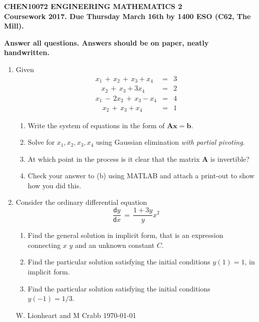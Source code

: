 \documentclass[12pt]{article}
\def\bA{\mathbf{A}}
\newcommand{\dif}{\mathsf{d}}
\begin{document}
\begin{center}{\bf\large
CHEN10072 ENGINEERING MATHEMATICS 2
\\
Coursework 2017. Due Thursday March 16th by 1400 ESO (C62, The Mill). 
}
\end{center}
\begin{center}{\bf
Answer all questions. Answers should be on paper, neatly handwritten.
}
\end{center}

\begin{enumerate}

\item 
Given
\vspace{-0.5cm}
\begin{eqnarray*}
x_1\,+\,x_2\,+\,x_3 + x_4&=&3\\
\,\,\,\,\,x_2\,+\,x_3 + 3x_4&=&2\\
x_1\,-\,2x_2\,+\,x_3 - x_4&=&4\\
\,\,\,\,\,\,x_2\,+\,x_3 + x_4&=&1
\end{eqnarray*}
            \begin{enumerate}
            \item Write the system of  equations in the form of $\bA \mathbf{x}=\mathbf{b}$.
             
            \item  Solve for $x_1,x_2,x_3,x_4$ using Gaussian elimination {\em with partial  pivoting}.
            \item At which point in the process is it clear that the matrix $\mathbf{A}$ is invertible?
            \item Check your answer to (b) using  MATLAB and attach a print-out to show how you did this.
    \end{enumerate}
	

\item
Consider the ordinary differential equation
$$ \frac{\dif y}{\dif x}\,=\,  \frac{1+3y}{y} x^2 $$
\begin{enumerate}
\item
Find the general solution in implicit form, that is an expression connecting  $x$ $y$ and an unknown constant $C$.
\item Find the particular solution satisfying the initial conditions $y(1)=1$,  in implicit form. 
\item Find the particular solution satisfying the initial conditions $y(-1)=1/3$. 
\end{enumerate}
\vspace{4cm}

\tiny{W. Lionheart and M Crabb \today}



\end{enumerate}
\end{document}
